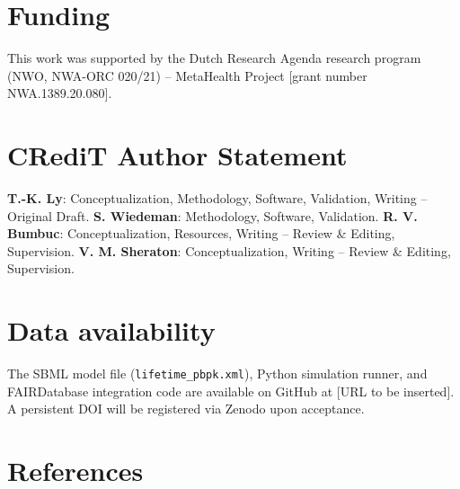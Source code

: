 \documentclass[preprint,12pt]{elsarticle}
\begin{document}
\begin{linenumbers}
\section*{Funding}
This work was supported by the Dutch Research Agenda research program
(NWO, NWA-ORC 020/21) -- MetaHealth Project [grant number
NWA.1389.20.080].

\section*{CRediT Author Statement}
\textbf{T.-K. Ly}: Conceptualization, Methodology, Software,
Validation, Writing -- Original Draft.
\textbf{S. Wiedeman}: Methodology, Software, Validation.
\textbf{R. V. Bumbuc}: Conceptualization, Resources,
Writing -- Review \& Editing, Supervision.
\textbf{V. M. Sheraton}: Conceptualization, Writing -- Review \&
Editing, Supervision.

\section*{Data availability}
The SBML model file (\texttt{lifetime\_pbpk.xml}), Python simulation
runner, and FAIRDatabase integration code are available on GitHub at
[URL to be inserted]. A persistent DOI will be registered via Zenodo
upon acceptance. %

%   
\section*{References}



\end{linenumbers}
\end{document}
